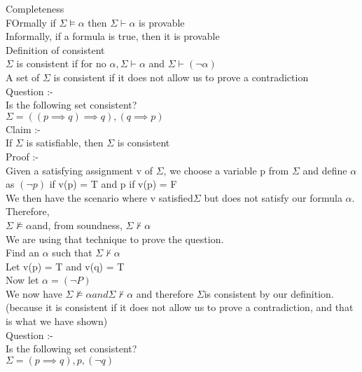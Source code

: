 \documentclass[12pt,oneside,fleqn]{article}
\theoremstyle{definition}
\begin{document}
Completeness \\
FOrmally if $\Sigma \vDash \alpha$ then $\Sigma \vdash \alpha$ is provable \\
Informally, if a formula is true, then it is provable \\

Definition of consistent \\
$\Sigma$ is consistent if for no $\alpha, \Sigma \vdash \alpha$ and $\Sigma \vdash (\neg \alpha)$ \\
A set of $\Sigma$ is consistent if it does not allow us to prove a contradiction \\

Question :- \\
Is the following set consistent? \\
$\Sigma = { ((p \implies q) \implies q), (q \implies p) }$ \\

Claim :- \\
If $\Sigma$ is satisfiable, then $\Sigma$ is consistent \\
Proof :- \\
Given a satisfying assignment v of $\Sigma$, we choose a variable p from $\Sigma$ and define $\alpha$ as $(\neg p)$ if v(p) = T and p if v(p) = F \\

We then have the scenario where v satisfied$ \Sigma$ but does not satisfy our formula $\alpha$. Therefore, \\
$\Sigma \not \vDash \alpha $and, from soundness, $\Sigma \not \vdash \alpha$ \\

We are using that technique to prove the question. \\
Find an $\alpha$ such that $\Sigma \not \vdash \alpha$ \\
Let v(p) = T and v(q) = T \\
Now let $\alpha = (\neg P)$ \\

We now have $\Sigma \not \vDash \alpha and \Sigma \not \vdash \alpha$ and therefore $\Sigma $is consistent by our definition. (because it is consistent if it does not allow us to prove a contradiction, and that is what we have shown) \\

Question :-  \\
Is the following set consistent? \\
$\Sigma = { (p \implies q), p, (\neg q) }$ \\
\end{document}
